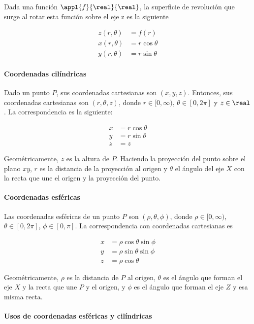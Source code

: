Dada una función $\appl{f}{\real}{\real}$, la superficie de revolución que surge al rotar esta función sobre el eje z es la siguiente

\begin{align*} z(r,\theta) &= f(r) \\
x(r,\theta) &= r \cos \theta \\
y(r,\theta) &= r \sin \theta \end{align*} 

\paragraph{Coordenadas cilíndricas}
Dado un punto $P$, sus coordenadas cartesianas son $(x,y,z)$. Entonces, sus coordenadas cartesianas son $(r,\theta, z)$, donde $r\in [0,\infty)$, $\theta \in [0,2\pi]$ y $z\in \real$. La correspondencia es la siguiente:

\begin{align*}
x &=r \cos \theta \\
y &= r \sin \theta \\
z &= z
\end{align*}

Geométricamente, $z$ es la altura de $P$. Haciendo la proyección del punto sobre el plano $xy$, $r$ es la distancia de la proyección al origen y $\theta$ el ángulo del eje $X$ con la recta que une el origen y la proyección del punto.

\paragraph{Coordenadas esféricas}
Las coordenadas esféricas de un punto $P$ son $(\rho, \theta, \phi)$, donde $\rho \in [0, \infty)$, $\theta\in [0, 2\pi]$, $\phi \in [0, \pi]$. La correspondencia con coordenadas cartesianas es

\begin{align*}
x&=\rho \cos \theta \sin \phi \\
y&= \rho \sin \theta \sin \phi \\
z &= \rho \cos \theta
\end{align*}

Geométricamente, $\rho$ es la distancia de $P$ al origen, $\theta$ es el ángulo que forman el eje $X$ y la recta que une $P$ y el origen, y $\phi$ es el ángulo que forman el eje $Z$ y esa misma recta.

\paragraph{Usos de coordenadas esféricas y cilíndricas}

